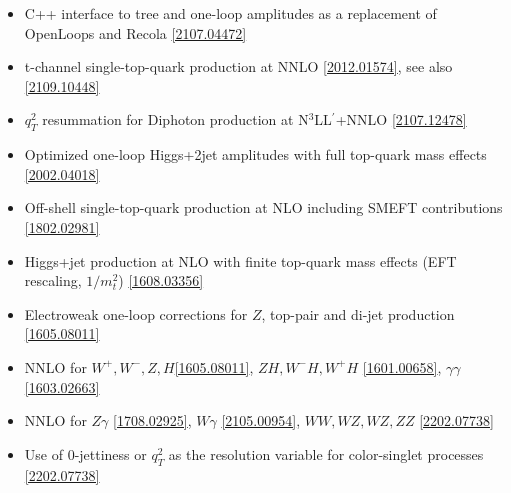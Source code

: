 \begin{itemize}
\item    C++ interface to tree and one-loop amplitudes as a replacement of OpenLoops and Recola \href{https://arxiv.org/abs/2107.04472}{[2107.04472]}
\item    t-channel single-top-quark production at NNLO \href{https://arxiv.org/abs/2012.01574}{[2012.01574]}, see also \href{https://arxiv.org/abs/2109.10448}{[2109.10448]}
\item    $q_T^2$ resummation for Diphoton production at N$^3$LL$^\prime$+NNLO \href{https://arxiv.org/abs/2107.12478}{[2107.12478]}
\item    Optimized one-loop Higgs+2jet amplitudes with full top-quark mass effects \href{https://arxiv.org/abs/2002.04018}{[2002.04018]}
\item    Off-shell single-top-quark production at NLO including SMEFT contributions \href{https://arxiv.org/abs/1802.02981}{[1802.02981]}
\item    Higgs+jet production at NLO with finite top-quark mass effects (EFT rescaling, $1/m_t^2$) \href{https://arxiv.org/abs/1608.03356}{[1608.03356]}
\item    Electroweak one-loop corrections for $Z$, top-pair and di-jet production \href{https://arxiv.org/abs/1605.08011}{[1605.08011]}
\item    NNLO for $W^+,W^-,Z,H$\href{https://arxiv.org/abs/1605.08011}{[1605.08011]}, $ZH,W^-H,W^+H$ \href{https://arxiv.org/abs/1601.00658}{[1601.00658]},
$\gamma\gamma$\href{https://arxiv.org/abs/1603.02663}{[1603.02663]}
\item    NNLO for $Z\gamma$ \href{https://arxiv.org/abs/1708.02925}{[1708.02925]}, $W\gamma$ \href{https://arxiv.org/abs/2105.00954}{[2105.00954]},
$WW,WZ,WZ,ZZ$ \href{https://arxiv.org/abs/2202.07738}{[2202.07738]}
\item    Use of 0-jettiness or $q_T^2$ as the resolution variable for color-singlet processes \href{https://arxiv.org/abs/2202.07738}{[2202.07738]}
\end{itemize}

